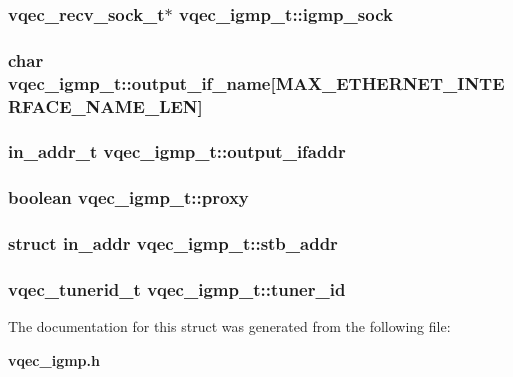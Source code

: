 \subsubsection{\setlength{\rightskip}{0pt plus 5cm}vqec\_\-recv\_\-sock\_\-t$\ast$ \bf{vqec\_\-igmp\_\-t::igmp\_\-sock}}\label{structvqec__igmp__t_bc2cc85963635d73b2bb601c5a051d5c}


\subsubsection{\setlength{\rightskip}{0pt plus 5cm}char \bf{vqec\_\-igmp\_\-t::output\_\-if\_\-name}[MAX\_\-ETHERNET\_\-INTERFACE\_\-NAME\_\-LEN]}\label{structvqec__igmp__t_cfdf0ab810cb5db3ea81aa84a6b94bd0}


\subsubsection{\setlength{\rightskip}{0pt plus 5cm}in\_\-addr\_\-t \bf{vqec\_\-igmp\_\-t::output\_\-ifaddr}}\label{structvqec__igmp__t_899e0c70a306b831a9d3291b49aea196}


\subsubsection{\setlength{\rightskip}{0pt plus 5cm}boolean \bf{vqec\_\-igmp\_\-t::proxy}}\label{structvqec__igmp__t_e80032fe1cfa88c4003c94cd1f2e0ca7}


\subsubsection{\setlength{\rightskip}{0pt plus 5cm}struct in\_\-addr \bf{vqec\_\-igmp\_\-t::stb\_\-addr}}\label{structvqec__igmp__t_b45280ac552b49bd9c9bbc9619614413}


\subsubsection{\setlength{\rightskip}{0pt plus 5cm}vqec\_\-tunerid\_\-t \bf{vqec\_\-igmp\_\-t::tuner\_\-id}}\label{structvqec__igmp__t_467e60c8fa8043a33ff6421022edcad0}




The documentation for this struct was generated from the following file:\begin{CompactItemize}
\item 
\bf{vqec\_\-igmp.h}\end{CompactItemize}
